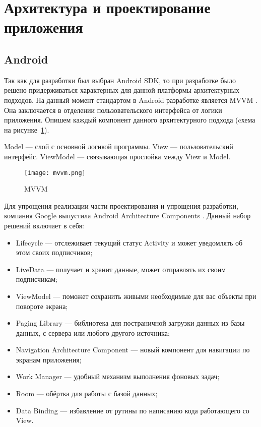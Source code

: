 \section{Архитектура и проектирование приложения}
\label{sec:arch_and_mod}
 
\subsection{Android}
Так как для разработки был выбран Android SDK, то при разработке было решено придерживаться характерных для данной платформы архитектурных подходов.
На данный момент стандартом в Android разработке является MVVM \cite{web7}.
Она заключается в отделении пользовательского интерфейса от логики приложения. Опишем каждый компонент данного архитектурного подхода (cхема на рисунке~\ref{fig:arch:docs_connections}).

Model — слой с основной логикой программы.
View — пользовательский интерфейс.
ViewModel — связывающая прослойка между View и Model.

\begin{figure}[H]
 \centering
   \texttt{[image: mvvm.png]} 
   \caption{MVVM}
   \label{fig:arch:docs_connections}
\end{figure}

Для упрощения реализации части проектирования и упрощения разработки, компания Google выпустила Android Architecture Components \cite{web8}. Данный набор решений включает в себя:

\begin{itemize}
 \item Lifecycle — отслеживает текущий статус Activity и может уведомлять об этом своих подписчиков;
 \item LiveData — получает и хранит данные, может отправлять их своим подписчикам;
 \item ViewModel — поможет сохранить живыми необходимые для вас объекты при повороте экрана;
 \item Paging Library — библиотека для постраничной загрузки данных из базы данных, с сервера или любого другого источника;
 \item Navigation Architecture Component — новый компонент для навигации по экранам приложения;
 \item Work Manager — удобный механизм выполнения фоновых задач;
 \item Room — обёртка для работы с базой данных;
 \item Data Binding — избавление от рутины по написанию кода работающего со View.
 \end{itemize}

